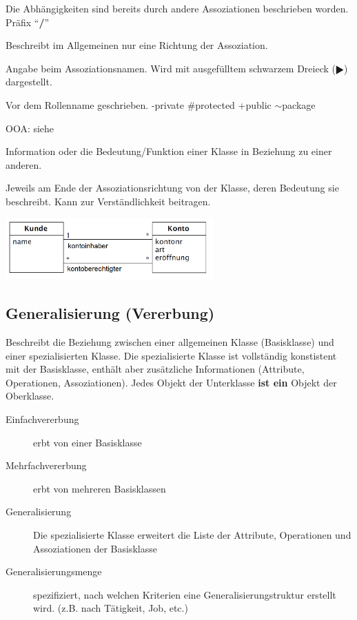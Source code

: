 \begin{description}
    \item[abgeleitete Assoziation] 
      Die Abhängigkeiten sind bereits durch andere Assoziationen beschrieben worden.
      Präfix "`\textbf{/}"'
    \item[Assoziationsname] 
      Beschreibt im Allgemeinen nur eine Richtung der Assoziation. 
    \item[Leserichtung] 
      Angabe beim Assoziationsnamen. Wird mit ausgefülltem schwarzem Dreieck ($\RHD$) dargestellt.
    \item[Sichtbarkeit] 
      Vor dem Rollenname geschrieben. -private \#protected +public $\sim$package
    \item[Eigenschaftswert] 
      OOA: siehe 
      
    \parbox{5cm}{
      \item[Rolle]
        Information oder die Bedeutung/Funktion einer Klasse in Beziehung zu einer anderen.
      \item[Rollenname]
        Jeweils am Ende der Assoziationsrichtung von der Klasse, 
        deren Bedeutung sie beschreibt. Kann zur Verständlichkeit beitragen.}
    \hspace{0.5cm}
    \parbox{8cm}{\includegraphics[width=8cm]{./bilder/Rolle.png}}
  \end{description}

\subsection{Generalisierung (Vererbung) }
  Beschreibt die Beziehung zwischen einer allgemeinen Klasse (Basisklasse) und
  einer spezialisierten Klasse. Die spezialisierte Klasse ist vollständig
  konstistent mit der Basisklasse, enthält aber zusätzliche Informationen
  (Attribute, Operationen, Assoziationen). Jedes Objekt der Unterklasse \textbf{ist ein} 
  Objekt der Oberklasse.
  
  \begin{description}
    \item[Einfachvererbung]
      erbt von einer Basisklasse
    \item[Mehrfachvererbung]
      erbt von mehreren Basisklassen
    \item[Generalisierung] 
      Die spezialisierte Klasse erweitert die Liste der
      Attribute, Operationen und Assoziationen der Basisklasse
    \item[Generalisierungsmenge] 
      spezifiziert, nach welchen Kriterien eine Generalisierungstruktur erstellt wird.
      (z.B. nach Tätigkeit, Job, etc.)
  \end{description}

